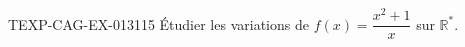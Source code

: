 \begin{exercice}{TEXP-CAG-EX-013}{1}{15}
Étudier les variations de $f(x) = \dfrac{x^2+1}{x}$ sur $\mathbb{R}^*$.

\end{exercice}
